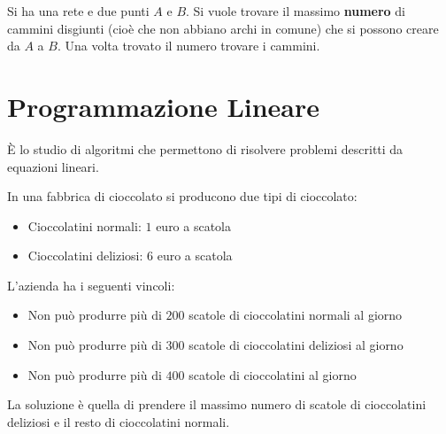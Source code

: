\documentclass[a4paper]{article}
\begin{document}
\begin{exercise}
  Si ha una rete e due punti \( A \) e \( B \). Si vuole trovare il massimo \textbf{numero}
  di cammini disgiunti (cioè che non abbiano archi in comune) che si possono creare
  da \( A \) a \( B \). Una volta trovato il numero trovare i cammini.
\end{exercise}

\section{Programmazione Lineare}
È lo studio di algoritmi che permettono di risolvere problemi descritti da equazioni
lineari.
\begin{example}
  In una fabbrica di cioccolato si producono due tipi di cioccolato:
  \begin{itemize}
    \item Cioccolatini normali: \( 1 \) euro a scatola
    \item Cioccolatini deliziosi: \( 6 \) euro a scatola
  \end{itemize}
  L'azienda ha i seguenti vincoli:
  \begin{itemize}
    \item Non può produrre più di \( 200 \) scatole di cioccolatini normali al giorno
    \item Non può produrre più di \( 300 \) scatole di cioccolatini deliziosi al giorno
    \item Non può produrre più di \( 400 \) scatole di cioccolatini al giorno
  \end{itemize}
  La soluzione è quella di prendere il massimo numero di scatole di cioccolatini deliziosi
  e il resto di cioccolatini normali.


\end{example}
\end{document}
